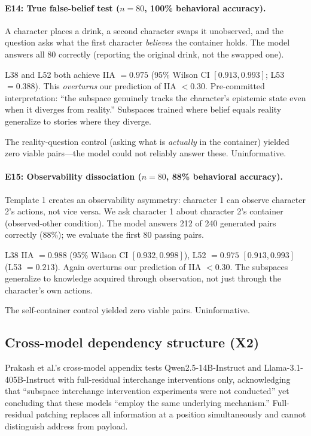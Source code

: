\documentclass{article}
\begin{document}
\paragraph{E14: True false-belief test ($n = 80$, 100\% behavioral accuracy).}
A character places a drink, a second character swaps it unobserved, and the question asks what the first character \emph{believes} the container holds. The model answers all 80 correctly (reporting the original drink, not the swapped one).

L38 and L52 both achieve IIA $= 0.975$ (95\% Wilson CI $[0.913, 0.993]$; L53 $= 0.388$). This \emph{overturns} our prediction of IIA $< 0.30$. Pre-committed interpretation: ``the subspace genuinely tracks the character's epistemic state even when it diverges from reality.'' Subspaces trained where belief equals reality generalize to stories where they diverge.

The reality-question control (asking what is \emph{actually} in the container) yielded zero viable pairs---the model could not reliably answer these. Uninformative.

\paragraph{E15: Observability dissociation ($n = 80$, 88\% behavioral accuracy).}
Template 1 creates an observability asymmetry: character 1 can observe character 2's actions, not vice versa. We ask character 1 about character 2's container (observed-other condition). The model answers 212 of 240 generated pairs correctly (88\%); we evaluate the first 80 passing pairs.

L38 IIA $= 0.988$ (95\% Wilson CI $[0.932, 0.998]$), L52 $= 0.975$ $[0.913, 0.993]$ (L53 $= 0.213$). Again overturns our prediction of IIA $< 0.30$. The subspaces generalize to knowledge acquired through observation, not just through the character's own actions.

The self-container control yielded zero viable pairs. Uninformative.

\subsection{Cross-model dependency structure (X2)}
\label{sec:crossmodel}

Prakash et al.'s cross-model appendix tests Qwen2.5-14B-Instruct and Llama-3.1-405B-Instruct with full-residual interchange interventions only, acknowledging that ``subspace interchange intervention experiments were not conducted'' yet concluding that these models ``employ the same underlying mechanism.'' Full-residual patching replaces all information at a position simultaneously and cannot distinguish address from payload.
\end{document}
